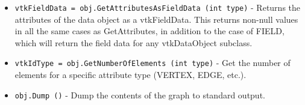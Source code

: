 \begin{itemize}
\item  \verb|vtkFieldData = obj.GetAttributesAsFieldData (int type)| -  Returns the attributes of the data object as a vtkFieldData.
 This returns non-null values in all the same cases as GetAttributes,
 in addition to the case of FIELD, which will return the field data
 for any vtkDataObject subclass.

\item  \verb|vtkIdType = obj.GetNumberOfElements (int type)| -  Get the number of elements for a specific attribute type (VERTEX, EDGE, etc.).

\item  \verb|obj.Dump ()| -  Dump the contents of the graph to standard output.

\end{itemize}
